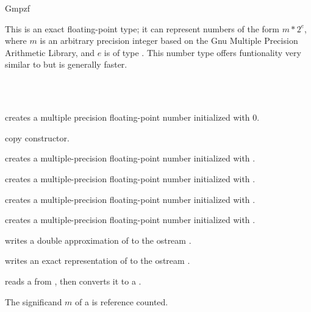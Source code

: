 \begin{ccRefClass} {Gmpzf}
\label{Gmpzf}

\ccDefinition

This is an exact floating-point type; it can represent numbers
of the form $m*2^e$, where $m$ is an arbitrary precision integer 
based on the {\sc Gnu} Multiple Precision Arithmetic Library,
and $e$ is of type . This number type offers funtionality
very similar to  but is generally faster.


\ccIsModel
{}\\
\\

\ccCreation
{}

             {creates a multiple precision floating-point number
               initialized with $0$.}

\ccHidden {}
            {copy constructor.}

            {creates a multiple-precision floating-point number 
              initialized with
             .}

            {creates a multiple-precision floating-point number 
              initialized with
             .}

            {creates a multiple-precision floating-point number 
              initialized with
             .}

            {creates a multiple-precision  floating-point number
              initialized with .}
\ccOperations

{writes a double approximation of  to the ostream .}

{writes an exact representation of  to the ostream .}

{reads a  from , then converts it to a .}

\ccImplementation
The significand $m$ of a  is reference counted.

\end{ccRefClass} 
